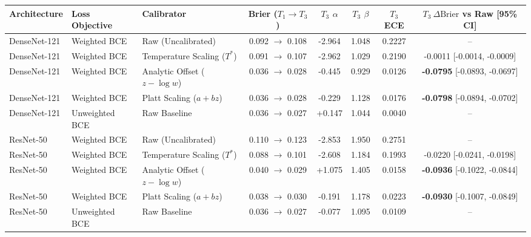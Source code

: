 \begin{tabular}{lllccccc}
\toprule
\textbf{Architecture} & \textbf{Loss Objective} & \textbf{Calibrator} & \textbf{Brier ($T_1 \to T_3$)} & \textbf{$T_3$ $\alpha$} & \textbf{$T_3$ $\beta$} & \textbf{$T_3$ ECE} & \textbf{$T_3\ \Delta\text{Brier}$ vs Raw [95\% CI]} \\
\midrule
DenseNet-121 & Weighted BCE & Raw (Uncalibrated) & 0.092 $\to$ 0.108 & -2.964 & 1.048 & 0.2227 & -- \\
DenseNet-121 & Weighted BCE & Temperature Scaling ($T^*$) & 0.091 $\to$ 0.107 & -2.962 & 1.029 & 0.2190 & -0.0011 [-0.0014, -0.0009] \\
DenseNet-121 & Weighted BCE & Analytic Offset ($z - \log w$) & 0.036 $\to$ 0.028 & -0.445 & 0.929 & 0.0126 & \textbf{-0.0795} [-0.0893, -0.0697] \\
DenseNet-121 & Weighted BCE & Platt Scaling ($a + bz$) & 0.036 $\to$ 0.028 & -0.229 & 1.128 & 0.0176 & \textbf{-0.0798} [-0.0894, -0.0702] \\
DenseNet-121 & Unweighted BCE & Raw Baseline & 0.036 $\to$ 0.027 & +0.147 & 1.044 & 0.0040 & -- \\
\midrule
ResNet-50 & Weighted BCE & Raw (Uncalibrated) & 0.110 $\to$ 0.123 & -2.853 & 1.950 & 0.2751 & -- \\
ResNet-50 & Weighted BCE & Temperature Scaling ($T^*$) & 0.088 $\to$ 0.101 & -2.608 & 1.184 & 0.1993 & -0.0220 [-0.0241, -0.0198] \\
ResNet-50 & Weighted BCE & Analytic Offset ($z - \log w$) & 0.040 $\to$ 0.029 & +1.075 & 1.405 & 0.0158 & \textbf{-0.0936} [-0.1022, -0.0844] \\
ResNet-50 & Weighted BCE & Platt Scaling ($a + bz$) & 0.038 $\to$ 0.030 & -0.191 & 1.178 & 0.0223 & \textbf{-0.0930} [-0.1007, -0.0849] \\
ResNet-50 & Unweighted BCE & Raw Baseline & 0.036 $\to$ 0.027 & -0.077 & 1.095 & 0.0109 & -- \\
\bottomrule
\end{tabular}
